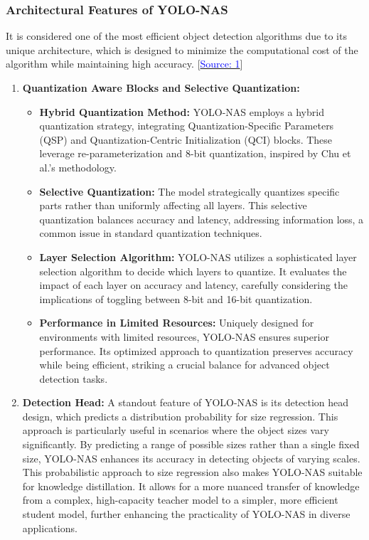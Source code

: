 \subsubsection{Architectural Features of YOLO-NAS} \vspace{0mm}It is considered one of the most efficient object detection algorithms due to its unique architecture, which is designed to minimize the computational cost of the algorithm while maintaining high accuracy. \cite{yolo-nas-vs-yolov8}[\href{https://deci.ai/blog/yolov8-vs-yolo-nas-showdown-exploring-advanced-object-detection/#:~:text=Quantization%20Aware%20Blocks%20and%20Selective%20Quantization&text=This%20architecture%20utilizes%20Quantization%2DSpecific,parameterization%20with%208%2Dbit%20quantization.}{\textcolor{blue}{Source: 1}}]   
\begin{enumerate}
    \item \textbf{Quantization Aware Blocks and Selective Quantization: } 
        \begin{itemize}
            \item \textbf{Hybrid Quantization Method: } YOLO-NAS employs a hybrid quantization strategy, integrating Quantization-Specific Parameters (QSP) and Quantization-Centric Initialization (QCI) blocks. These leverage re-parameterization and 8-bit quantization, inspired by Chu et al.'s methodology.
            \item  \textbf{Selective Quantization:} The model strategically quantizes specific parts rather than uniformly affecting all layers. This selective quantization balances accuracy and latency, addressing information loss, a common issue in standard quantization techniques.
                \item \textbf{Layer Selection Algorithm:} YOLO-NAS utilizes a sophisticated layer selection algorithm to decide which layers to quantize. It evaluates the impact of each layer on accuracy and latency, carefully considering the implications of toggling between 8-bit and 16-bit quantization.
                \item \textbf{Performance in Limited Resources:} Uniquely designed for environments with limited resources, YOLO-NAS ensures superior performance. Its optimized approach to quantization preserves accuracy while being efficient, striking a crucial balance for advanced object detection tasks.
        \end{itemize}
    \item \textbf{Detection Head: } A standout feature of YOLO-NAS is its detection head design, which predicts a distribution probability for size regression. This approach is particularly useful in scenarios where the object sizes vary significantly. By predicting a range of possible sizes rather than a single fixed size, YOLO-NAS enhances its accuracy in detecting objects of varying scales. This probabilistic approach to size regression also makes YOLO-NAS suitable for knowledge distillation. It allows for a more nuanced transfer of knowledge from a complex, high-capacity teacher model to a simpler, more efficient student model, further enhancing the practicality of YOLO-NAS in diverse applications.

\end{enumerate}
